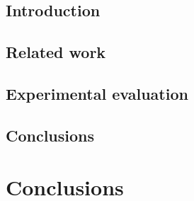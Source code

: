 \documentclass[%
	paper=A4,				%
	twoside=true,				%
	openright,				%
	parskip=full,				%
	chapterprefix=true,			%
	11pt,					%
	headings=normal,			%
	bibliography=totoc,			%
	listof=totoc,				%
	titlepage=on,				%
	captions=tableabove,			%
	draft=false,				%
]{scrreprt}%
\begin{document}
\section{Introduction}
\begin{abstract}\end{abstract}

\section{Related work}


\section{Experimental evaluation}

\section{Conclusions}



\chapter{Conclusions}



\cleardoublepage


\cleardoublepage

\listoffigures
\cleardoublepage

\listoftables
\cleardoublepage

\newpage

\end{document}
